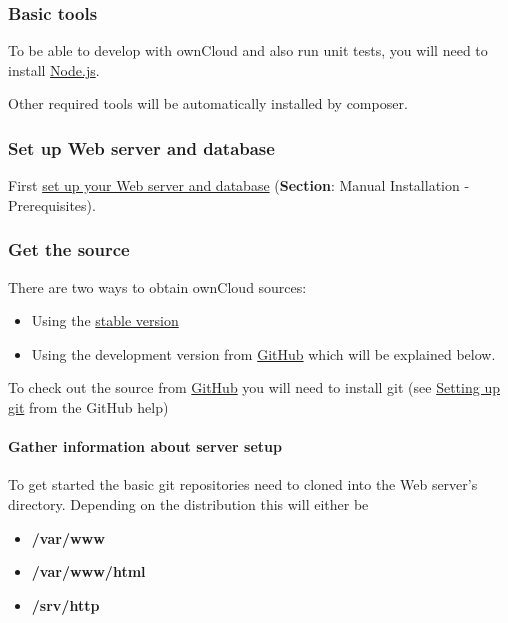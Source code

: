 \documentclass[letterpaper,10pt,english]{sphinxmanual}
\begin{document}
\subsubsection{Basic tools}
\label{general/devenv:basic-tools}
To be able to develop with ownCloud and also run unit tests, you will need to install \href{https://nodejs.org}{Node.js}.

Other required tools will be automatically installed by composer.


\subsubsection{Set up Web server and database}
\label{general/devenv:set-up-web-server-and-database}
First \href{https://doc.owncloud.org/server/9.0/admin\_manual/installation/index.html}{set up your Web server and database} (\textbf{Section}: Manual Installation - Prerequisites).


\subsubsection{Get the source}
\label{general/devenv:get-the-source}
There are two ways to obtain ownCloud sources:
\begin{itemize}
\item {} 
Using the \href{https://doc.owncloud.org/server/9.0/admin\_manual/\#installation}{stable version}

\end{itemize}
\begin{itemize}
\item {} 
Using the development version from \href{https://github.com/owncloud}{GitHub} which will be explained below.

\end{itemize}

To check out the source from \href{https://github.com/owncloud}{GitHub} you will need to install git (see \href{https://help.github.com/articles/set-up-git}{Setting up git} from the GitHub help)


\paragraph{Gather information about server setup}
\label{general/devenv:gather-information-about-server-setup}
To get started the basic git repositories need to cloned into the Web server's directory. Depending on the distribution this will either be
\begin{itemize}
\item {} 
\textbf{/var/www}

\item {} 
\textbf{/var/www/html}

\item {} 
\textbf{/srv/http}

\end{itemize}
\end{document}
